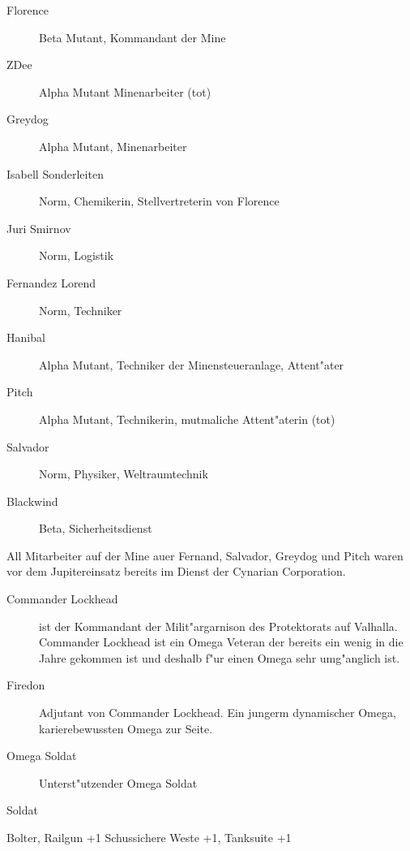 \begin{description}
    \item[Florence] Beta Mutant, Kommandant der Mine    
    \item[ZDee] Alpha Mutant Minenarbeiter (tot)
    \item[Greydog] Alpha Mutant, Minenarbeiter
    \item[Isabell Sonderleiten] Norm, Chemikerin, Stellvertreterin von Florence
    \item[Juri Smirnov] Norm, Logistik
    \item[Fernandez Lorend] Norm, Techniker
    \item[Hanibal] Alpha Mutant, Techniker der Minensteueranlage, Attent"ater
    \item[Pitch] Alpha Mutant, Technikerin, mutma\3liche Attent"aterin (tot)
    \item[Salvador] Norm, Physiker, Weltraumtechnik
    \item[Blackwind] Beta, Sicherheitsdienst
\end{description}

All Mitarbeiter auf der Mine au\3er Fernand, Salvador, Greydog und Pitch waren vor dem Jupitereinsatz bereits im Dienst der Cynarian Corporation.



\begin{description}
    \item[Commander Lockhead] ist der Kommandant der Milit"argarnison des Protektorats auf Valhalla. Commander Lockhead ist ein Omega Veteran der bereits ein wenig in die Jahre gekommen ist und deshalb f"ur einen Omega sehr umg"anglich ist. 
    \item[Firedon] Adjutant von Commander Lockhead. Ein jungerm dynamischer Omega, karierebewussten Omega zur Seite.
    \item[Omega Soldat] Unterst"utzender Omega Soldat
\end{description}

\begin{nscsheet}{Soldat}
    \nscstats[ATT=3,AGG=2,CON=2]
    \nscruler
    \begin{nscinventory}
        \nscitem[Waffen] Bolter, Railgun +1
        \nscitem[R"ustung] Schussichere Weste +1, Tanksuite +1
    \end{nscinventory}
\end{nscsheet}



